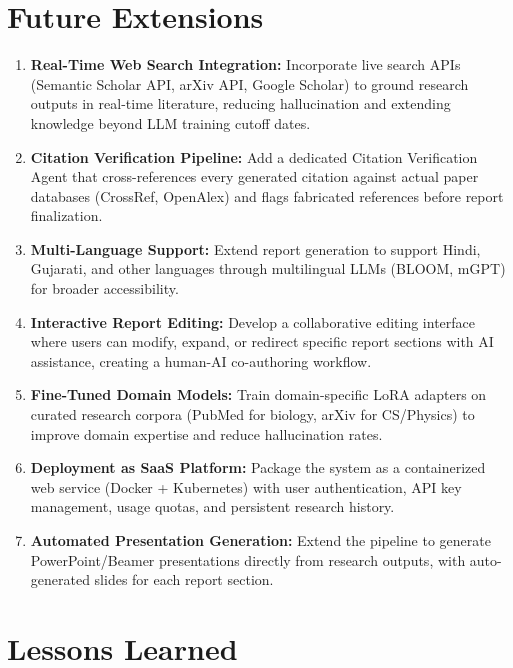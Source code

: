 \documentclass[a4paper,12pt,openany]{report}
\begin{document}
\section{Future Extensions}

\begin{enumerate}[label=\arabic*., leftmargin=2cm]
\item \textbf{Real-Time Web Search Integration:} Incorporate live search APIs (Semantic Scholar API, arXiv API, Google Scholar) to ground research outputs in real-time literature, reducing hallucination and extending knowledge beyond LLM training cutoff dates.

\item \textbf{Citation Verification Pipeline:} Add a dedicated Citation Verification Agent that cross-references every generated citation against actual paper databases (CrossRef, OpenAlex) and flags fabricated references before report finalization.

\item \textbf{Multi-Language Support:} Extend report generation to support Hindi, Gujarati, and other languages through multilingual LLMs (BLOOM, mGPT) for broader accessibility.

\item \textbf{Interactive Report Editing:} Develop a collaborative editing interface where users can modify, expand, or redirect specific report sections with AI assistance, creating a human-AI co-authoring workflow.

\item \textbf{Fine-Tuned Domain Models:} Train domain-specific LoRA adapters on curated research corpora (PubMed for biology, arXiv for CS/Physics) to improve domain expertise and reduce hallucination rates.

\item \textbf{Deployment as SaaS Platform:} Package the system as a containerized web service (Docker + Kubernetes) with user authentication, API key management, usage quotas, and persistent research history.

\item \textbf{Automated Presentation Generation:} Extend the pipeline to generate PowerPoint/Beamer presentations directly from research outputs, with auto-generated slides for each report section.
\end{enumerate}

\section{Lessons Learned}
\end{document}

